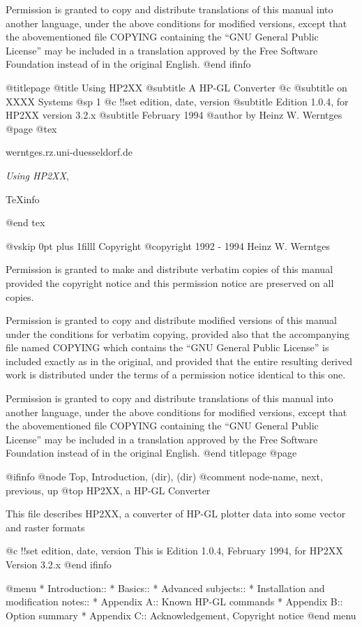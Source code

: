 Permission is granted to copy and distribute translations of this manual
into another language, under the above conditions for modified versions,
except that the abovementioned file COPYING containing the
``GNU General Public License'' may be included in a translation approved
by the Free Software Foundation instead of in the original English.
@end ifinfo

@titlepage
@title Using HP2XX
@subtitle A HP-GL Converter
@c @subtitle on XXXX Systems
@sp 1
@c !!set edition, date, version
@subtitle Edition 1.0.4, for HP2XX version 3.2.x
@subtitle February 1994
@author by Heinz W. Werntges
@page
@tex
{\parskip=0pt
\hfill werntges\@convex.rz.uni-duesseldorf.de\par
\hfill {\it Using HP2XX}, \manvers\par
\hfill \TeX{}info \texinfoversion\par
}
@end tex

@vskip 0pt plus 1filll
Copyright @copyright{} 1992 - 1994 Heinz W. Werntges

Permission is granted to make and distribute verbatim copies of
this manual provided the copyright notice and this permission notice
are preserved on all copies.

Permission is granted to copy and distribute modified versions of this
manual under the conditions for verbatim copying, provided also that the
accompanying file named COPYING which contains the ``GNU General Public
License'' is included exactly as in the original, and provided that the
entire resulting derived work is distributed under the terms of a permission
notice identical to this one.

Permission is granted to copy and distribute translations of this manual
into another language, under the above conditions for modified versions,
except that the abovementioned file COPYING containing the
``GNU General Public License'' may be included in a translation approved
by the Free Software Foundation instead of in the original English.
@end titlepage
@page

@ifinfo
@node Top, Introduction, (dir), (dir)
@comment  node-name,  next,  previous,  up
@top HP2XX, a HP-GL Converter

This file describes HP2XX, a converter of HP-GL plotter data into
some vector and raster formats

@c !!set edition, date, version
This is Edition 1.0.4, February 1994, for HP2XX Version 3.2.x
@end ifinfo


@menu
* Introduction::
* Basics::
* Advanced subjects::
* Installation and modification notes::
* Appendix A::                          Known HP-GL commands
* Appendix B::                          Option summary
* Appendix C::                          Acknowledgement, Copyright notice
@end menu


